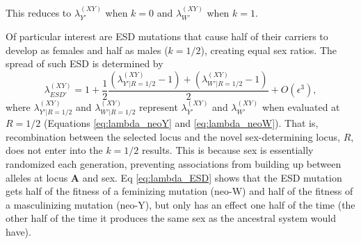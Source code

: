 \documentclass[10pt,letterpaper]{article}
\begin{document}
\noindent
This reduces to $\lambda_{Y'}^{(XY)}$ when $k=0$ and $\lambda_{W'}^{(XY)}$ when $k=1$. 

Of particular interest are ESD mutations that cause half of their carriers to develop as females and half as males ($k=1/2$), creating equal sex ratios.
The spread of such ESD is determined by
\begin{equation}
\lambda_{ESD'}^{(XY)} =1+ \frac{1}{2}\frac{(\lambda_{Y'\rvert R=1/2}^{(XY)}-1) + (\lambda_{W'\rvert R=1/2}^{(XY)}-1)}{2} + O\left(\epsilon^3\right),
\label{eq:lambda_ESD}
\end{equation}
\noindent
where $\lambda_{Y'\rvert R=1/2}^{(XY)}$ and $\lambda_{W'\rvert R=1/2}^{(XY)}$ represent $\lambda_{Y'}^{(XY)}$ and $\lambda_{W'}^{(XY)}$ when evaluated at $R=1/2$ (Equations \ref{eq:lambda_neoY} and \ref{eq:lambda_neoW}).
That is, recombination between the selected locus and the novel sex-determining locus, $R$, does not enter into the $k=1/2$ results.
This is because sex is essentially randomized each generation, %
preventing associations from building up between alleles at locus $\mathbf{A}$ and sex. 
Eq \eqref{eq:lambda_ESD} shows that the ESD mutation gets half of the fitness of a feminizing mutation (neo-W) and half of the fitness of a masculinizing mutation (neo-Y), but only has an effect one half of the time (the other half of the time it produces the same sex as the ancestral system would have). 
\end{document}

